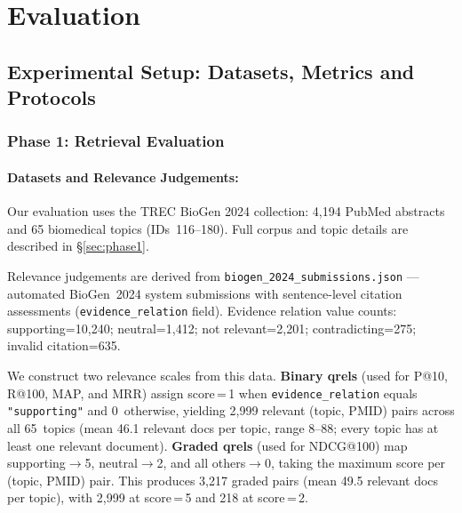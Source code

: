 
\section{Evaluation}
\label{sec:eval}

\subsection{Experimental Setup: Datasets, Metrics and Protocols}
\label{sec:eval_setup}

\subsubsection{Phase 1: Retrieval Evaluation}

\paragraph{Datasets and Relevance Judgements:}
Our evaluation uses the TREC BioGen 2024 collection: 4{,}194 PubMed abstracts
and 65 biomedical topics (IDs~116--180).  Full corpus and topic details are
described in §\ref{sec:phase1}.

Relevance judgements are derived from
\texttt{biogen\_2024\_\allowbreak submissions.json} --- automated BioGen~2024 system
submissions with sentence-level citation assessments
(\texttt{evidence\_relation} field).
Evidence relation value counts:
supporting=10{,}240; neutral=1{,}412; not relevant=2{,}201;
contradicting=275; invalid citation=635.

We construct two relevance scales from this data.
\textbf{Binary qrels} (used for P@10, R@100, MAP, and MRR) assign score\,=\,1
when \texttt{evidence\_relation} equals \texttt{"supporting"} and 0~otherwise, yielding
2{,}999 relevant (topic, PMID) pairs across all 65~topics (mean 46.1 relevant
docs per topic, range 8--88; every topic has at least one relevant document).
\textbf{Graded qrels} (used for NDCG@100) map supporting$\to$5,
neutral$\to$2, and all others$\to$0, taking the maximum score per
(topic, PMID) pair.  This produces 3{,}217 graded pairs (mean 49.5 relevant
docs per topic), with 2{,}999 at score\,=\,5 and 218 at score\,=\,2.

